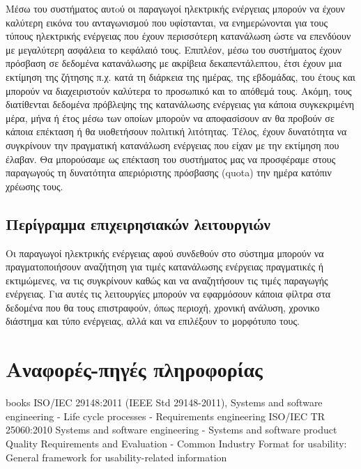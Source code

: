 \documentclass[a4paper,12pt, oneside]{article}
\begin{document}
Μέσω του συστήματος αυτoύ οι παραγωγοί ηλεκτρικής ενέργειας μπορούν να έχουν καλύτερη εικόνα του ανταγωνισμού που υφίστανται, να ενημερώνονται για τους τύπους ηλεκτρικής ενέργειας που έχουν περισσότερη κατανάλωση ώστε να επενδύουν με μεγαλύτερη ασφάλεια το κεφάλαιό τους. Επιπλέον, μέσω του συστήματος έχουν πρόσβαση σε δεδομένα κατανάλωσης με ακρίβεια δεκαπεντάλεπτου, έτσι έχουν μια εκτίμηση της ζήτησης π.χ. κατά τη διάρκεια της ημέρας, της εβδομάδας, του έτους και μπορούν να διαχειριστούν καλύτερα το προσωπικό και το απόθεμά τους. Ακόμη, τους διατίθενται δεδομένα πρόβλεψης της κατανάλωσης ενέργειας για κάποια συγκεκριμένη μέρα, μήνα ή έτος μέσω των οποίων μπορούν να αποφασίσουν αν θα προβούν σε κάποια επέκταση ή θα υιοθετήσουν πολιτική λιτότητας. Τέλος, έχουν δυνατότητα να συγκρίνουν την πραγματική κατανάλωση ενέργειας που είχαν με την εκτίμηση που έλαβαν. Θα μπορούσαμε ως επέκταση του συστήματος μας να προσφέραμε στους παραγωγούς τη δυνατότητα απεριόριστης πρόσβασης (\textlatin{quota}) την ημέρα κατόπιν χρέωσης τους.

\subsection{Περίγραμμα επιχειρησιακών λειτουργιών}
Οι παραγωγοί ηλεκτρικής ενέργειας αφού συνδεθούν στο σύστημα μπορούν να πραγματοποιήσουν αναζήτηση για τιμές κατανάλωσης ενέργειας πραγματικές ή εκτιμώμενες, να τις συγκρίνουν καθώς και να αναζητήσουν τις τιμές παραγωγής ενέργειας. Για αυτές τις λειτουργίες μπορούν να εφαρμόσουν κάποια φίλτρα στα δεδομένα που θα τους επιστραφούν, όπως περιοχή, χρονική ανάλυση, χρονικο διάστημα και τύπο ενέργειας, αλλά και να  επιλέξουν το μορφότυπο τους.

\newpage
\section{Αναφορές-πηγές πληροφορίας}
\begingroup
\renewcommand{\section}{\subsection}
\begin{thebibliography} {books}
\latintext
{} ISO/IEC 29148:2011 (IEEE Std 29148-2011), Systems and software engineering - Life cycle processes - Requirements engineering
 ISO/IEC TR 25060:2010  Systems and software engineering - Systems and software product Quality Requirements and Evaluation - Common Industry Format for usability: General framework for usability-related information
\end{thebibliography}
\endgroup
\end{document}
